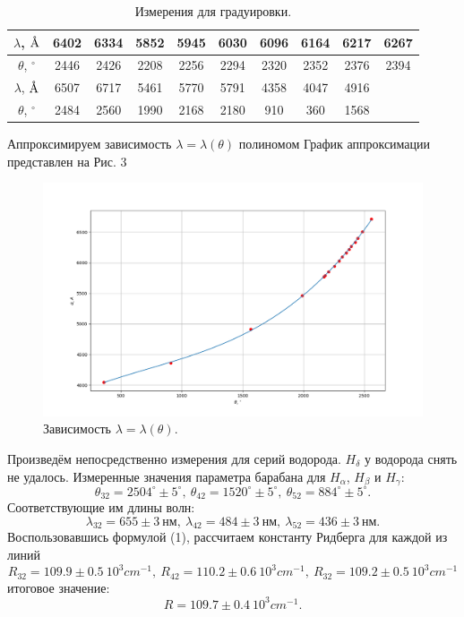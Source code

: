 \documentclass[a4paper,12pt]{article}
\newcommand{\angstrom}{\text{\normalfont\AA}}
\begin{document}
\begin{table}[h]
\begin{tabular}{|c|c|c|c|c|c|c|c|c|c|}
\hline
$\lambda$, $\angstrom$ & 6402 & 6334 & 5852 & 5945 & 6030 & 6096 & 6164 & 6217 & 6267 \\ \hline
$\theta$, $^\circ$  & 2446 & 2426 & 2208 & 2256 & 2294 & 2320 & 2352 & 2376 & 2394 \\ \hhline{|==========|}
$\lambda$, $\angstrom$ & 6507 & 6717 & 5461 & 5770 & 5791 & 4358 & 4047 & 4916 \\ \hline
$\theta$, $^\circ$  & 2484 & 2560 & 1990 & 2168 & 2180 & 910  & 360  & 1568  \\ \hline
\end{tabular}
\centering
\caption{Измерения для градуировки.}
\end{table}
Аппроксимируем зависимость $\lambda = \lambda(\theta)$ полиномом
График аппроксимации представлен на Рис. 3
\newpage
\begin{figure}
\includegraphics[scale=0.6]{3.png}
\centering
\caption{Зависимость $\lambda = \lambda(\theta)$.}
\end{figure}
Произведём непосредственно измерения для серий водорода. $H_\delta$ у водорода снять не удалось. Измеренные значения параметра барабана для $H_\alpha$, $H_\beta$ и $H_\gamma$:
\[\theta_{32} = 2504^\circ \pm 5^\circ,~\theta_{42} = 1520^\circ \pm 5^\circ,~\theta_{52} = 884^\circ \pm 5^\circ.\]
Соответствующие им длины волн:
\[\lambda_{32} = 655 \pm 3~\text{нм},~\lambda_{42} = 484 \pm 3~\text{нм},~\lambda_{52} = 436 \pm 3~\text{нм}.\]
Воспользовавшись формулой (1), рассчитаем константу Ридберга для каждой из линий
\[R_{32}=109.9 \pm 0.5~ 10^3 cm^{-1},~ R_{42}=110.2 \pm 0.6~ 10^3 cm^{-1},~ R_{32}=109.2 \pm 0.5~ 10^3 cm^{-1} \]
итоговое значение:
\[R = 109.7 \pm 0.4~10^3cm^{-1}.\]
\end{document}
